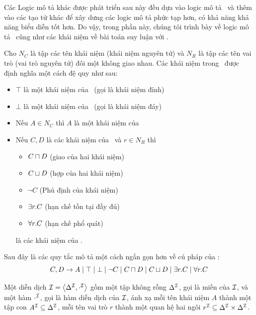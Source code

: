 Các Logic mô tả khác được phát triển sau này đều dựa vào logic mô tả \ALC\ và thêm vào các tạo tử khác để xây dưng các logic mô tả phức tạp hơn, có khả năng khả năng biểu diễn tốt hơn. Do vậy, trong phần này, chúng tôi trình bày về logic mô tả \ALC\ cũng như các khái niệm về bài toán suy luận với \ALC.

\begin{Definition}
\label{chap1.def:SyntaxALC}
Cho $N_C$ là tập các tên khái niệm (khái niệm nguyên tử) và $N_R$ là tập các tên vai trò (vai trò nguyên tử) đôi một không giao nhau. Các khái niệm trong \ALC\ được định nghĩa một cách đệ quy như sau:
\begin{itemize}
  \item $\top$ là một khái niệm của \ALC\ (gọi là khái niệm đỉnh)
  \item $\bot$ là một khái niệm của \ALC\ (gọi là khái niệm đáy)
  \item Nếu $A \in N_C$ thì $A$ là một khái niệm của \ALC
  \item Nếu $C, D$ là các khái niệm của \ALC\ và $r \in N_R$ thì
  \begin{itemize}
    \item $C \sqcap D$ (giao của hai khái niệm)
    \item $C \sqcup D$ (hợp của hai khái niệm)
    \item $\neg C$ (Phủ định của khái niệm)
    \item $\exists r.C$ (hạn chế tồn tại đầy đủ)
    \item $\forall r.C$ (hạn chế phổ quát)
  \end{itemize}
  là các khái niệm của \ALC.\myend
\end{itemize}
\end{Definition}
Sau đây là các quy tắc mô tả một cách ngắn gọn hơn về cú pháp của \ALC:
\begin{equation*}
C, D \rightarrow A \mid \top \mid \bot \mid \neg C \mid C \sqcap D \mid C \sqcup D \mid \exists r.C \mid \forall r.C
\end{equation*}

\begin{Definition}
\label{def:SemanticALC}

Một diễn dịch $\mathcal{I} = \left\langle\Delta^{\mathcal{I}}, \cdot^{\mathcal{I}}\right\rangle$ gồm một tập không rỗng $\Delta^{\mathcal{I}}$, gọi là \textnormal{miền} của $\mathcal{I}$, và một hàm $\cdot^{\mathcal{I}}$, gọi là \textnormal{hàm diễn dịch} của $\mathcal{I}$, ánh xạ mỗi tên khái niệm $A$ thành một tập con $A^{\mathcal{I}} \subseteq \Delta^{\mathcal{I}}$, mỗi tên vai trò $r$ thành một quan hệ hai ngôi $r^{\mathcal{I}} \subseteq \Delta^{\mathcal{I}} \times \Delta^{\mathcal{I}}$.
\end{Definition}

